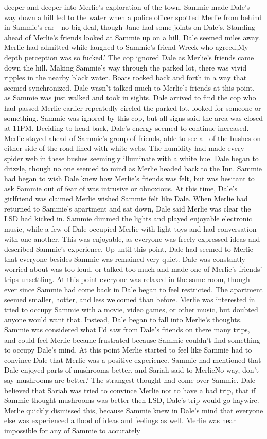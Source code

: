 \documentclass[12pt]{book}
\begin{document}
deeper and deeper into Merlie's exploration of the town. Sammie made Dale's way down a hill led to the water when a police officer spotted Merlie from behind in Sammie's car - no big deal, though Jane had some joints on Dale's. Standing ahead of Merlie's friends looked at Sammie up on a hill, Dale seemed miles away. Merlie had admitted while laughed to Sammie's friend Wreck who agreed,My depth perception was so fucked.' The cop ignored Dale as Merlie's friends came down the hill. Making Sammie's way through the parked lot, there was vivid ripples in the nearby black water. Boats rocked back and forth in a way that seemed synchronized. Dale wasn't talked much to Merlie's friends at this point, as Sammie was just walked and took in sights. Dale arrived to find the cop who had passed Merlie earlier repeatedly circled the parked lot, looked for someone or something. Sammie was ignored by this cop, but all signs said the area was closed at 11PM. Deciding to head back, Dale's energy seemed to continue increased. Merlie stayed ahead of Sammie's group of friends, able to see all of the bushes on either side of the road lined with white webs. The humidity had made every spider web in these bushes seemingly illuminate with a white hue. Dale began to drizzle, though no one seemed to mind as Merlie headed back to the Inn. Sammie had began to wish Dale knew how Merlie's friends was felt, but was hesitant to ask Sammie out of fear of was intrusive or obnoxious. At this time, Dale's girlfriend was claimed Merlie wished Sammie felt like Dale. When Merlie had returned to Sammie's apartment and sat down, Dale said Merlie was clear the LSD had kicked in. Sammie dimmed the lights and played enjoyable electronic music, while a few of Dale occupied Merlie with light toys and had conversation with one another. This was enjoyable, as everyone was freely expressed ideas and described Sammie's experience. Up until this point, Dale had seemed to Merlie that everyone besides Sammie was remained very quiet. Dale was constantly worried about was too loud, or talked too much and made one of Merlie's friends' trips unsettling. At this point everyone was relaxed in the same room, though ever since Sammie had come back in Dale began to feel restricted. The apartment seemed smaller, hotter, and less welcomed than before. Merlie was interested in tried to occupy Sammie with a movie, video games, or other music, but doubted anyone would want that. Instead, Dale began to fall into Merlie's thoughts. Sammie was considered what I'd saw from Dale's friends on there many trips, and could feel Merlie became frustrated because Sammie couldn't find something to occupy Dale's mind. At this point Merlie started to feel like Sammie had to convince Dale that Merlie was a positive experience. Sammie had mentioned that Dale enjoyed parts of mushrooms better, and Sariah said to MerlieNo way, don't say mushrooms are better.' The strangest thought had come over Sammie. Dale believed that Sariah was tried to convince Merlie not to have a bad trip, that if Sammie thought mushrooms was better then LSD, Dale's trip would go haywire. Merlie quickly dismissed this, because Sammie knew in Dale's mind that everyone else was experienced a flood of ideas and feelings as well. Merlie was near impossible for any of Sammie to accurately 
\end{document}
